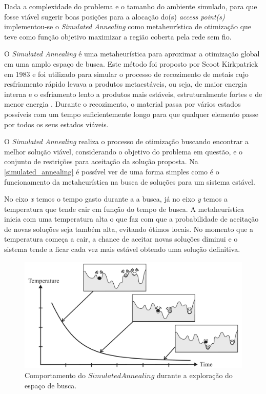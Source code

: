 \documentclass[
	12pt,				%
	twoside,			%
	a4paper,			%
	english,			%
	french,				%
	spanish,			%
	brazil				%
	]{abntex2}
\begin{document}
Dada a complexidade do problema e o tamanho do ambiente simulado, para
que fosse viável sugerir boas posições para a alocação do(s)
\emph{access point(s)} implementou-se o \emph{Simulated Annealing} como
metaheurística de otimização que teve como função objetivo maximizar a
região coberta pela rede sem fio.

O \emph{Simulated Annealing} é uma metaheurística para aproximar a
otimização global em uma amplo espaço de busca. Este método foi proposto
por Scoot Kirkpatrick em 1983 e foi utilizado para simular o processo de
recozimento de metais cujo resfriamento rápido levava a produtos
metaestáveis, ou seja, de maior energia interna e o esfriamento lento a
produtos mais estáveis, estruturalmente fortes e de menor energia
\cite{VAN}. Durante o recozimento, o material passa por vários estados
possíveis com um tempo suficientemente longo para que qualquer elemento
passe por todos os seus estados viáveis.

O \emph{Simulated Annealing} realiza o processo de otimização buscando
encontrar a melhor solução viável, considerando o objetivo do problema
em questão, e o conjunto de restrições para aceitação da solução
proposta. Na \autoref{simulated_annealing} é possível ver de uma forma
simples como é o funcionamento da metaheurística na busca de soluções
para um sistema estável.

No eixo \emph{x} temos o tempo gasto durante a a busca, já no eixo
\emph{y} temos a temperatura que tende cair em função do tempo de busca.
A metaheurística inicia com uma temperatura alta o que faz com que a
probabilidade de aceitação de novas soluções seja também alta, evitando
ótimos locais. No momento que a temperatura começa a cair, a chance de
aceitar novas soluções diminui e o sistema tende a ficar cada vez mais
estável obtendo uma solução definitiva.

\begin{figure}[htb]
    \caption{\label{simulated_annealing} Comportamento do $Simulated Annealing$ durante a exploração do espaço de busca.}
    \begin{center}
        \includegraphics[scale=0.185]{imagens/simulated-annealing.png}
    \end{center}
\end{figure}
\end{document}
